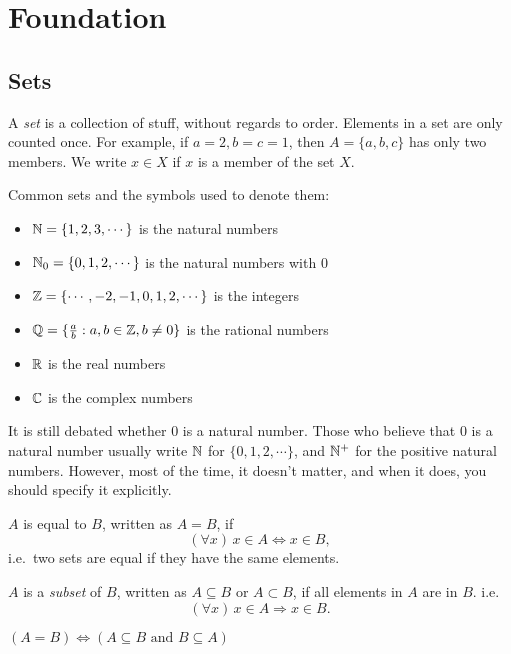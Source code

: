 \section{Foundation}
\subsection{Sets}

\begin{defi}[Set]
A \emph{set} is a collection of stuff, without regards to order. Elements in a set are only counted once. For example, if $a = 2, b = c = 1$, then $A = \{a, b, c\}$ has only two members. We write $x\in X$ if $x$ is a member of the set $X$.
\end{defi}

\begin{eg}
Common sets and the symbols used to denote them:
\begin{itemize}
    \item $\mathbb{N} = \{1, 2, 3, \cdots \}$ is the natural numbers
    \item $\mathbb{N}_0 = \{0, 1, 2, \cdots \}$ is the natural numbers with $0$
    \item $\mathbb{Z} = \{\cdots, -2, -1, 0, 1, 2, \cdots \}$ is the integers
    \item $\mathbb{Q} = \{\frac{a}{b}: a, b\in \mathbb{Z}, b \not= 0\}$ is the rational numbers
    \item $\mathbb{R}$ is the real numbers
    \item $\mathbb{C}$ is the complex numbers
\end{itemize}
It is still debated whether $0$ is a natural number. Those who believe that $0$ is a natural number usually write $\mathbb{N}$ for $\{0, 1, 2, \cdots\}$, and $\mathbb{N}^+$ for the positive natural numbers. However, most of the time, it doesn't matter, and when it does, you should specify it explicitly.
\end{eg}
\begin{defi}
$A$ is equal to $B$, written as $A = B$, if
\[
    (\forall x)\,x\in A \Leftrightarrow x\in B,
\]
i.e.\ two sets are equal if they have the same elements.
\end{defi}

\begin{defi}[Subsets]
$A$ is a \emph{subset} of $B$, written as $A\subseteq B$ or $A\subset B$, if all elements in $A$ are in $B$. i.e.
\[
    (\forall x)\,x\in A\Rightarrow x\in B.
\]
\end{defi}

\begin{thm}
$(A=B)\Leftrightarrow (A\subseteq B \text{ and }B\subseteq A)$
\end{thm}

